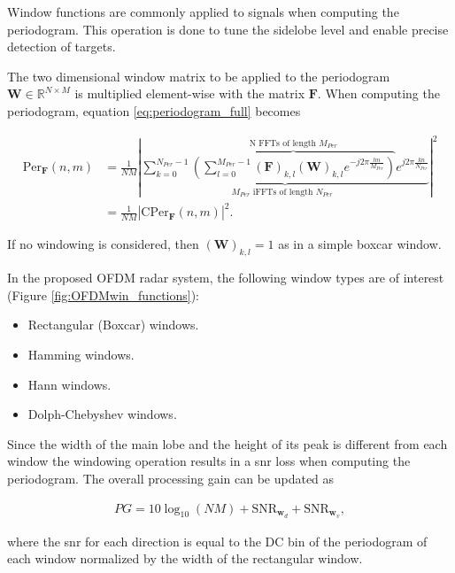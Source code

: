 	Window functions are commonly applied to signals when computing the periodogram. This operation is done to tune the sidelobe level and enable precise detection of targets. 
	
	The two dimensional window matrix to be applied to the periodogram $\mathbf W \in \mathbb{R}^{N\times M}$ is multiplied element-wise with the matrix $\mathbf F$. When computing the periodogram, equation \ref{eq:periodogram_full} becomes
	
	
	   \begin{align*}
		\text{Per}_{\mathbf F}(n,m) &= \frac{1}{NM} \left| \underbrace{ \sum_{k=0}^{N_{Per}-1}  \overbrace{\left( \sum_{l=0}^{M_{Per}-1} (\bm{F})_{k,l} (\mathbf W)_{k,l} e^{-j2\pi \frac{lm}{M_{Per}}} \right)}^{\text{N FFTs of length $M_{Per}$}}  e^{j2\pi\frac{kn}{N_{Per}}}}_{ \text{$M_{Per}$ iFFTs of length $N_{Per}$ }} \right| ^ 2\\
		&= \frac{1}{NM} \left| \text{CPer}_{\bm{F}}(n,m) \right| ^ 2.
		\end{align*}
	 
	 If no windowing is considered, then $(\mathbf W)_{k,l} = 1$ as in a simple boxcar window.
	 
	 In the proposed OFDM radar system, the following window types are of interest (Figure \ref{fig:OFDMwin_functions}):
	 
	 \begin{itemize}
	 	\item Rectangular (Boxcar) windows.
	 	\item Hamming windows.
	 	\item Hann windows.
	 	\item Dolph-Chebyshev windows.
	 \end{itemize}
	
	
	Since the width of the main lobe and the height of its peak is different from each window the windowing operation results in a \gls{snr} loss when computing the periodogram.
	The overall processing gain can be updated as
	
	\begin{align*}
		PG = 10\log_{10}(NM) + \text{SNR}_{\bm{w}_d} + \text{SNR}_{\bm{w}_v},
	\end{align*}
	
	where the \gls{snr} for each direction is equal to the DC bin of the periodogram of each window normalized by the width of the rectangular window.
	
